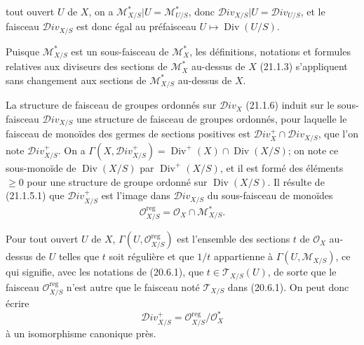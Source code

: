 tout ouvert $U$ de $X$, on a
$\mathscr M_{X/S}^*|U=\mathscr M_{U/S}^*$, donc
$\mathscr{D}iv_{X/S}|U=\mathscr{D}iv_{U/S}$, et le faisceau
$\mathscr{D}iv_{X/S}$ est donc égal au préfaisceau
$U\mapsto\operatorname{Div}(U/S)$.

Puisque $\mathscr M_{X/S}^*$ est un sous-faisceau de $\mathscr M_X^*$, les
définitions, notations et formules relatives aux diviseurs des sections de
$\mathscr M_X^*$ au-dessus de $X$ (21.1.3) s'appliquent sans changement aux sections
de $\mathscr M_{X/S}^*$ au-dessus de $X$.

\begin{env}[21.15.3]
\label{IV.21.15.3}
La structure de faisceau de groupes ordonnés sur $\mathscr{D}iv_X$ (21.1.6) induit
sur le sous-faisceau $\mathscr{D}iv_{X/S}$ une structure de faisceau de groupes
ordonnés, pour laquelle le faisceau de monoïdes des germes de sections positives est
$\mathscr{D}iv_X^+\cap\mathscr{D}iv_{X/S}$, que l'on note
$\mathscr{D}iv_{X/S}^+$. On a
$\Gamma(X,\mathscr{D}iv_{X/S}^+)=\operatorname{Div}^+(X)\cap
\operatorname{Div}(X/S)$; on note ce sous-monoïde de $\operatorname{Div}(X/S)$ par
$\operatorname{Div}^+(X/S)$, et il est formé des éléments $\geq0$ pour une structure
de groupe ordonné sur $\operatorname{Div}(X/S)$. Il résulte de (21.1.5.1) que
$\mathscr{D}iv_{X/S}^+$ est l'image dans $\mathscr{D}iv_{X/S}$ du sous-faisceau de
monoïdes
\[
\label{IV.21.15.3.1}
  \mathcal O_{X/S}^{\mathrm{reg}}=\mathcal O_X\cap\mathscr M_{X/S}^*.
  \tag{21.15.3.1}
\]
\end{env}

Pour tout ouvert $U$ de $X$, $\Gamma(U,\mathcal O_{X/S}^{\mathrm{reg}})$ est
l'ensemble des sections $t$ de $\mathcal O_X$ au-dessus de $U$ telles que $t$ soit
régulière et que $1/t$ appartienne à $\Gamma(U,\mathscr M_{X/S})$, ce qui signifie,
avec les notations de (20.6.1), que $t\in\mathscr T_{X/S}(U)$, de sorte que le faisceau
$\mathcal O_{X/S}^{\mathrm{reg}}$ n'est autre que le faisceau noté $\mathscr T_{X/S}$
dans (20.6.1). On peut donc écrire
\[
\label{IV.21.15.3.2}
  \mathscr{D}iv_{X/S}^+=\mathcal O_{X/S}^{\mathrm{reg}}/\mathcal O_X^*
  \tag{21.15.3.2}
\]
à un isomorphisme canonique près.

